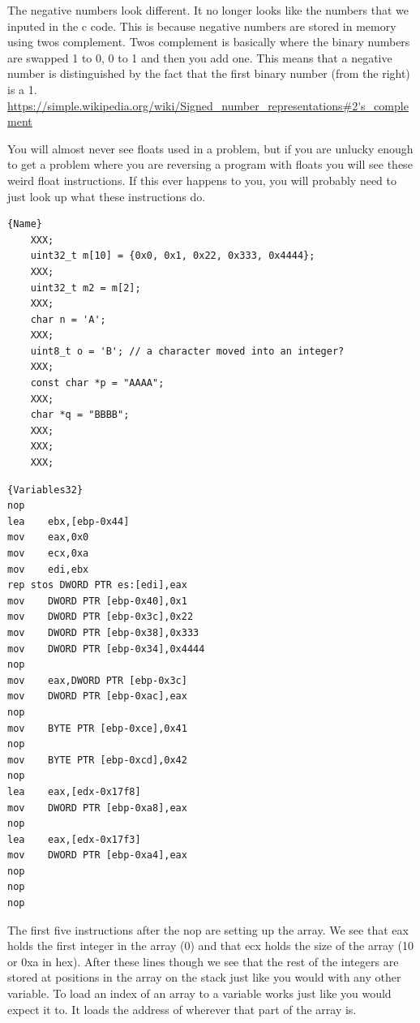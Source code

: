 \documentclass{report}
\begin{document}
The negative numbers look different.  It no longer looks like the numbers that we inputed in the c code.  This is because negative numbers are stored in memory using twos complement.  Twos complement is basically where the binary numbers are swapped 1 to 0, 0 to 1 and then you add one.  This means that a negative number is distinguished by the fact that the first binary number (from the right) is a 1.
\url{https://simple.wikipedia.org/wiki/Signed_number_representations#2's_complement} 

You will almost never see floats used in a problem, but if you are unlucky enough to get a problem where you are reversing a program with floats you will see these weird float instructions.  If this ever happens to you, you will probably need to just look up what these instructions do.

\begin{minipage}{.45\textwidth}
\begin{lstlisting}[caption=Variables part2,frame=tlrb]{Name}
    XXX;
    uint32_t m[10] = {0x0, 0x1, 0x22, 0x333, 0x4444};
    XXX;
    uint32_t m2 = m[2];
    XXX;
    char n = 'A';
    XXX;
    uint8_t o = 'B'; // a character moved into an integer?
    XXX;
    const char *p = "AAAA";
    XXX;
    char *q = "BBBB";
    XXX;
    XXX;
    XXX;

\end{lstlisting}
\end{minipage}\hfill
\begin{minipage}{.45\textwidth}
\begin{lstlisting}[caption=assembly 32bit,frame=tlrb]{Variables32}
nop
lea    ebx,[ebp-0x44]
mov    eax,0x0
mov    ecx,0xa
mov    edi,ebx
rep stos DWORD PTR es:[edi],eax
mov    DWORD PTR [ebp-0x40],0x1
mov    DWORD PTR [ebp-0x3c],0x22
mov    DWORD PTR [ebp-0x38],0x333
mov    DWORD PTR [ebp-0x34],0x4444
nop
mov    eax,DWORD PTR [ebp-0x3c]
mov    DWORD PTR [ebp-0xac],eax
nop
mov    BYTE PTR [ebp-0xce],0x41
nop
mov    BYTE PTR [ebp-0xcd],0x42
nop
lea    eax,[edx-0x17f8]
mov    DWORD PTR [ebp-0xa8],eax
nop
lea    eax,[edx-0x17f3]
mov    DWORD PTR [ebp-0xa4],eax
nop
nop
nop

\end{lstlisting}
\end{minipage}

The first five instructions after the nop are setting up the array.  We see that eax holds the first integer in the array (0) and that ecx holds the size of the array (10 or 0xa in hex).  After these lines though we see that the rest of the integers are stored at positions in the array on the stack just like you would with any other variable.
To load an index of an array to a variable works just like you would expect it to.  It loads the address of wherever that part of the array is.  
\end{document}
